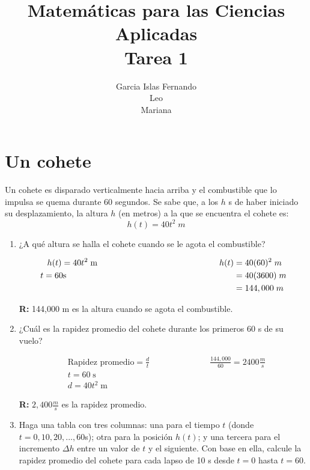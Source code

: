 \documentclass[12pt]{article}
\title{Matemáticas para las Ciencias Aplicadas \\ Tarea 1}
\date{}
\author{Garcia Islas Fernando \\ Leo\\Mariana}
\begin{document}
\maketitle
\section{\large Un cohete}
Un cohete es disparado verticalmente hacia arriba y el combustible que lo impulsa se quema durante 60 segundos. Se sabe que, a los $h$ s de haber iniciado su desplazamiento, la altura $h$ (en metros) a la que se encuentra el cohete es: \[h(t) = 40 t^2 \; m\]
\begin{enumerate}

\item ¿A qué altura se halla el cohete cuando se le agota el combustible?
  
  \begin{align*}
    h(t)= 40t^2 \; \text{m} \hspace{5.1cm}    h(t)&=40(60)^2 \; m\\
t=60\text{s} \hspace{7cm}    &=40(3600) \; m\\
    &=144,000 \; m\\
  \end{align*}
  
  {\bf R:} 144,000 m es la altura cuando se agota el combustible.
  
\item ¿Cuál es la rapidez promedio del cohete durante los primeros 60 s de su vuelo?
  
  \begin{align*}
    &\text{Rapidez promedio}=\frac{d}{t} \hspace{3cm}\frac{144,000}{60}= 2400 \frac{m}{s}\\
    &t = 60\; \text{s} \\
    &d = 40t^2 \; \text{m} 
  \end{align*}
  
  {\bf R:} $2,400 \frac{m}{s}$ es la rapidez promedio.
  
\item Haga una tabla con tres columnas: una para el tiempo $t$ (donde $t = 0, 10, 20, . . . , 60 $s); otra para la posición $h(t)$; y una tercera para el incremento $\Delta h$ entre un valor de $t$ y el siguiente. Con base en ella, calcule la rapidez promedio del cohete para cada lapso de 10 s desde $t = 0$ hasta $t = 60$.
  

\end{enumerate}
\end{document}
